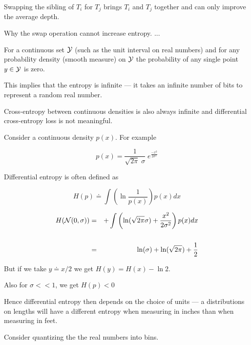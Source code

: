 {{\vfill
Swapping the sibling of $T_i$ for $T_j$ brings $T_i$ and $T_j$ together and can only improve the average depth.


Why the swap operation cannot increase entropy. ...
}


For a continuous set ${\cal Y}$ (such as the unit interval on real numbers)
and for any probability density (smooth measure) on ${\cal Y}$ the probability of
any single point $y \in {\cal Y}$ is zero.

\vfill
This implies that the entropy is infinite --- it takes an infinite number of bits to represent
a random real number.

\vfill
Cross-entropy between continuous densities is also always infinite and {\color{red} differential cross-entropy loss is not meaningful.}


Consider a continuous density $p(x)$.  For example

\vfill
$$p(x) = \frac{1}{\sqrt{2\pi}\; \sigma}\; e^{\frac{-x^2}{2\sigma^2}}$$

\vfill
Differential entropy is often defined as

\vfill
$$H(p) \doteq \int \left(\ln \frac{1}{p(x)}\right) p(x) dx$$


\begin{eqnarray*}
  H({\cal N}(0,\sigma)) & = &  + \int \left( \ln(\sqrt{2\pi} \sigma) + \frac{x^2}{2\sigma^2}\right) p(x) dx \\
  \\
  & = & \ln(\sigma) + \ln(\sqrt{2\pi}) + \frac{1}{2}
\end{eqnarray*}

\vfill
But if we take $y \doteq x/2$ we get $H(y) = H(x) - \ln 2$.

\vfill
Also for $\sigma << 1$, we get $H(p) < 0$

\vfill
Hence differential entropy then depends on the choice of units --- a distributions on lengths will have a different entropy
when measuring in inches than when measuring in feet.


Consider quantizing the the real numbers into bins.

}
